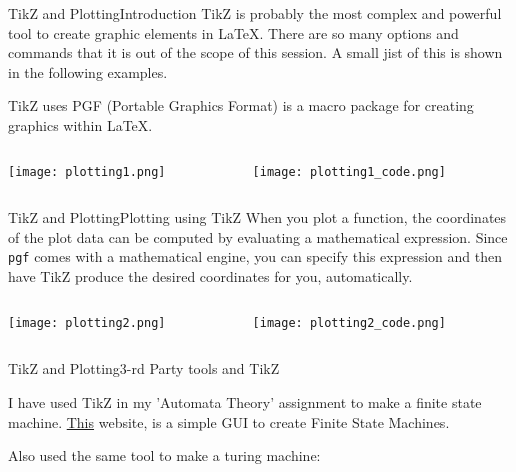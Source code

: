 \begin{frame}{TikZ and Plotting}{Introduction}
\small
TikZ is probably the most complex and powerful tool to create graphic elements
in \LaTeX. There are so many options and commands that it is out of the scope of
this session. A small jist of this is shown in the following examples.\\
\vspace{1em}

TikZ uses PGF (Portable Graphics Format) is a macro package for creating
graphics within \LaTeX.

\begin{columns}
    \begin{column}{0.3\textwidth}
        \texttt{[image: plotting1.png]}
    \end{column}
    \begin{column}{0.7\textwidth}
        \texttt{[image: plotting1\_code.png]}
    \end{column}
\end{columns}

\end{frame}

\begin{frame}{TikZ and Plotting}{Plotting using TikZ}
\small
When you plot a function, the coordinates of the plot data can be computed by
evaluating a mathematical expression. Since \texttt{pgf} comes with a mathematical
engine, you can specify this expression and then have TikZ produce the desired
coordinates for you, automatically.

\begin{columns}
    \begin{column}{0.4\textwidth}
        \texttt{[image: plotting2.png]}
    \end{column}
    \begin{column}{0.6\textwidth}
        \texttt{[image: plotting2\_code.png]}
    \end{column}
\end{columns}

\end{frame}


\begin{frame}{TikZ and Plotting}{3-rd Party tools and TikZ}

    \tiny
    I have used TikZ in my 'Automata Theory' assignment to make a finite state
    machine. \href{https://www.cs.unc.edu/~otternes/comp455/fsm\_designer/}{This}
    website, is a simple GUI to create Finite State Machines. \vspace{1em}

    Also used the same tool to make a turing machine:

\end{frame}
